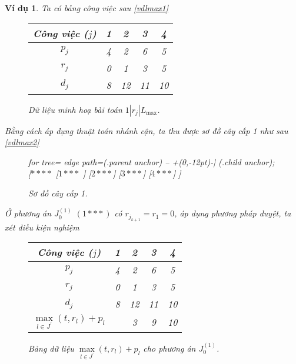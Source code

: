 \documentclass[12pt,a4paper]{report}
\newtheorem{vd}{Ví dụ}
\begin{document}
























\begin{vd}
Ta có bảng công việc sau \eqref{vdlmax1}

\begin{figure}[h!]
	\centering
	\begin{tabular}{|c | c c c c |} 
	\hline
	Công việc ($j$) & 1 & 2 & 3 & 4 \\
	\hline\hline
	$p_j$ & 4 & 2 & 6 & 5 \\
	$r_j$ & 0 & 1 & 3 & 5 \\
	$d_j$ & 8 & 12 & 11 & 10 \\
	\hline
	\end{tabular}
\caption{\label{vdlmax1} Dữ liệu minh hoạ bài toán $1 | r_j | L_{\max}$.}
\end{figure}

Bằng cách áp dụng thuật toán nhánh cận, ta thu được sơ đồ cây cấp 1 như sau \eqref{vdlmax2}


\begin{figure}[h!]
	\centering
	\begin{forest} for tree={
		edge path={\noexpand{} (.parent anchor) -- +(0,-12pt)-| (.child anchor);}
	}
	[{$****$}
		[$1***$
		]
		[$2***$]
		[$3***$]
		[$4***$]
	]
	\end{forest}
\caption{\label{vdlmax2} Sơ đồ cây cấp 1.}
\end{figure}

Ở phương án $J_0^{(1)}$ $(1***)$ có $r_{j_{k+1}} = r_1 = 0$, áp dụng phương pháp duyệt, ta xét điều kiện nghiệm

\begin{figure}[h!]
	\centering
	\begin{tabular}{|c | c c c c |} 
	\hline
	Công việc ($j$) & 1 & 2 & 3 & 4 \\
	\hline\hline
	$p_j$ & 4 & 2 & 6 & 5 \\
	$r_j$ & 0 & 1 & 3 & 5 \\
	$d_j$ & 8 & 12 & 11 & 10 \\
	$\underset{l \in J^{'}}{\max} (t, r_l) + p_l$ & & 3 & 9 & 10 \\ 
	\hline
	\end{tabular}
\caption{\label{vdlmax00} Bảng dữ liệu $\underset{l \in J^{'}}{\max} (t, r_l) + p_l$ cho phương án $J_0^{(1)}$.}
\end{figure}


\end{vd}
\end{document}

